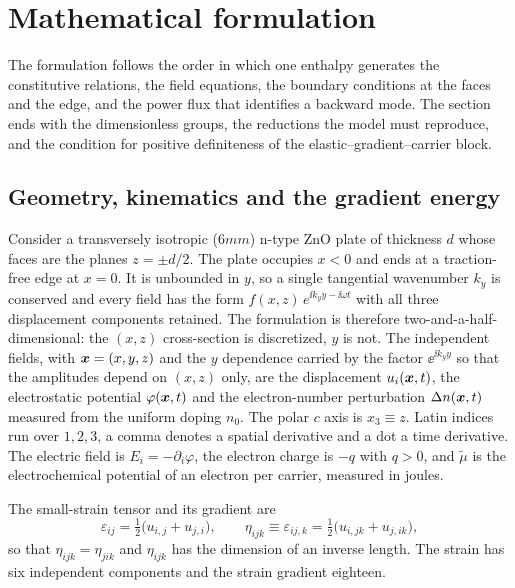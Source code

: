 \section{Mathematical formulation}
\label{sec:governing}

The formulation follows the order in which one enthalpy generates the constitutive relations, the field equations, the boundary conditions at the faces and the edge, and the power flux that identifies a backward mode.  The section ends with the dimensionless groups, the reductions the model must reproduce, and the condition for positive definiteness of the elastic--gradient--carrier block.

\subsection{Geometry, kinematics and the gradient energy}
\label{sec:governing_variational}
\label{sec:governing_kinematics}

Consider a transversely isotropic ($6mm$) n-type ZnO plate of thickness $d$ whose faces are the planes $z=\pm d/2$.  The plate occupies $x<0$ and ends at a traction-free edge at $x=0$.  It is unbounded in $y$, so a single tangential wavenumber $k_y$ is conserved and every field has the form $f(x,z)\,e^{\ii k_yy-\ii\omega t}$ with all three displacement components retained.  The formulation is therefore two-and-a-half-dimensional: the $(x,z)$ cross-section is discretized, $y$ is not.  The independent fields, with $\boldsymbol{x}=(x,y,z)$ and the $y$ dependence carried by the factor $\ee^{\ii k_yy}$ so that the amplitudes depend on $(x,z)$ only, are the displacement $u_i(\boldsymbol{x},t)$, the electrostatic potential $\varphi(\boldsymbol{x},t)$ and the electron-number perturbation $\Delta n(\boldsymbol{x},t)$ measured from the uniform doping $n_0$.  The polar $c$ axis is $x_3\equiv z$.  Latin indices run over $1,2,3$, a comma denotes a spatial derivative and a dot a time derivative.  The electric field is $E_i=-\partial_i\varphi$, the electron charge is $-q$ with $q>0$, and $\widetilde\mu$ is the electrochemical potential of an electron per carrier, measured in joules.

The small-strain tensor and its gradient are
\begin{equation}
\label{eq:strain}
\varepsilon_{ij}=\tfrac12\bigl(u_{i,j}+u_{j,i}\bigr),
\qquad
\eta_{ijk}\equiv\varepsilon_{ij,k}=\tfrac12\bigl(u_{i,jk}+u_{j,ik}\bigr),
\end{equation}
so that $\eta_{ijk}=\eta_{jik}$ and $\eta_{ijk}$ has the dimension of an inverse length.  The strain has six independent components and the strain gradient eighteen.


